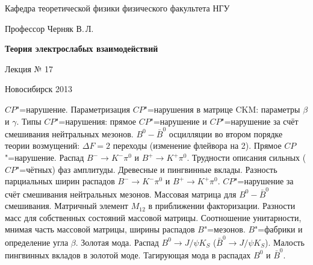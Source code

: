 \documentclass[12pt,pagesize,paper=landscape,paper=192mm:108mm]{scrbook}
\begin{document}
\begin{titlepage}
\begin{center}
    Кафедра теоретической физики физического факультета НГУ
    \medskip

    \Large
    Профессор Черняк В.\,Л.
    \bigskip

    \huge
    \textbf{Теория электрослабых взаимодействий}
    \bigskip

    \Large
    Лекция № 17
    \vfill

    \vfill

\normalsize    Новосибирск 2013
  \smallskip

  \ccbysa
  \end{center}
\end{titlepage}
\newpage

\vspace*{-1em}
\begin{center}
 \vfill
  \begin{minipage}{0.66\linewidth}
    $CP$"=нарушение. Параметризация $CP$"=нарушения в матрице CKM:
    параметры $\beta$ и $\gamma$.  Типы $CP$"=нарушения: прямое
    $CP$"=нарушение и $CP$"=нарушение за счёт смешивания нейтральных
    мезонов.  $B^0-\bar{B}^0$ осцилляции во втором порядке теории
    возмущений: $\Delta F = 2$ переходы (изменение флейвора на
    2). Прямое $CP$"=нарушение. Распад $B^-\to K^-\pi^0$ и $B^+\to
    K^+\pi^0$.  Трудности описания сильных ($CP$"=чётных) фаз
    амплитуды. Древесные и пингвинные вклады. Разность парциальных
    ширин распадов $B^-\to K^-\pi^0$ и $B^+\to K^+\pi^0$.
    $CP$"=нарушение за счёт смешивания нейтральных мезонов. Массовая
    матрица для $B^0-\bar{B}^0$ смешивания.  Матричный элемент
    $M_{12}$ в приближении факторизации. Разности масс для собственных
    состояний массовой матрицы.  Соотношение унитарности, мнимая часть
    массовой матрицы, ширины распадов $B$"=мезонов. $B$"=фабрики и
    определение угла $\beta$. Золотая мода.  Распад $B^0\to J/\psi
    K_S$ ($\bar{B}^0\to J/\psi K_S$).  Малость пингвинных вкладов в
    золотой моде. Тагирующая мода в распадах $B^0$ и $\bar{B}^0$.
  \end{minipage}
  \vfill

\end{center}
\end{document}
